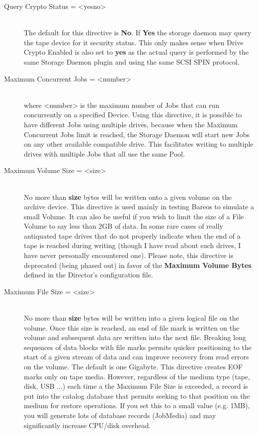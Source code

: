\begin{description}
\item [Query Crypto Status = {\textless}yes{\textbar}no{\textgreater}] \hfill \\
The default for this directive is {\bf No}. If {\bf Yes} the storage daemon
may query the tape device for it security status. This only makes sense when
Drive Crypto Enabled is also set to {\bf yes} as the actual query is performed
by the same Storage Daemon plugin and using the same SCSI SPIN protocol.

\item [Maximum Concurrent Jobs = {\textless}number{\textgreater}] \hfill \\
where {\textless}number{\textgreater} is the maximum number of Jobs that can run
concurrently on a specified Device.  Using this directive, it is possible
to have different Jobs using multiple drives, because when
the Maximum Concurrent Jobs limit is
reached, the Storage Daemon will start new Jobs on any other available
compatible drive.  This facilitates writing to multiple drives with
multiple Jobs that all use the same Pool.

\item [Maximum Volume Size = {\textless}size{\textgreater}] \hfill \\
No more than {\bf size} bytes will be written onto a given volume on the
archive device.  This directive is used mainly in testing Bareos to
simulate a small Volume.  It can also be useful if you wish to limit the
size of a File Volume to say less than 2GB of data.  In some rare cases
of really antiquated tape drives that do not properly indicate when the
end of a tape is reached during writing (though I have read about such
drives, I have never personally encountered one).  Please note, this
directive is deprecated (being phased out) in favor of the {\bf Maximum
Volume Bytes} defined in the Director's configuration file.

\item [Maximum File Size = {\textless}size{\textgreater}] \hfill \\
No more than {\bf size} bytes will be written into a given logical file
on the volume.  Once this size is reached, an end of file mark is
written on the volume and subsequent data are written into the next
file.  Breaking long sequences of data blocks with file marks permits
quicker positioning to the start of a given stream of data and can
improve recovery from read errors on the volume.  The default is one
Gigabyte.  This directive creates EOF marks only on tape media.
However, regardless of the medium type (tape, disk, USB ...) each time
a the Maximum File Size is exceeded, a record is put into the catalog
database that permits seeking to that position on the medium for
restore operations. If you set this to a small value (e.g. 1MB),
you will generate lots of database records (JobMedia) and may
significantly increase CPU/disk overhead.


\end{description}
